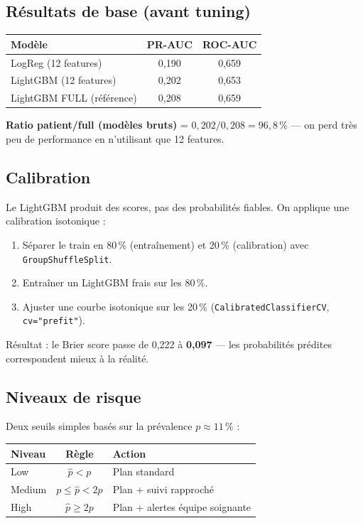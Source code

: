 \documentclass[11pt,a4paper]{article}
\begin{document}
\subsection{R\'esultats de base (avant tuning)}

\begin{center}
\begin{tabular}{@{}lcc@{}}
\toprule
\textbf{Mod\`ele} & \textbf{PR-AUC} & \textbf{ROC-AUC} \\
\midrule
LogReg (12 features) & 0{,}190 & 0{,}659 \\
LightGBM (12 features) & 0{,}202 & 0{,}653 \\
LightGBM FULL (r\'ef\'erence) & 0{,}208 & 0{,}659 \\
\bottomrule
\end{tabular}
\end{center}

\textbf{Ratio patient/full (mod\`eles bruts)} = $0{,}202 / 0{,}208 = 96{,}8\,\%$ --- on perd tr\`es peu de performance en n'utilisant que 12 features.

\subsection{Calibration}

Le LightGBM produit des scores, pas des probabilit\'es fiables. On applique une calibration isotonique :
\begin{enumerate}
  \item S\'eparer le train en 80\,\% (entra\^inement) et 20\,\% (calibration) avec \texttt{GroupShuffleSplit}.
  \item Entra\^iner un LightGBM frais sur les 80\,\%.
  \item Ajuster une courbe isotonique sur les 20\,\% (\texttt{CalibratedClassifierCV}, \texttt{cv="prefit"}).
\end{enumerate}

R\'esultat : le Brier score passe de 0{,}222 \`a \textbf{0{,}097} --- les probabilit\'es pr\'edites correspondent mieux \`a la r\'ealit\'e.

\subsection{Niveaux de risque}

Deux seuils simples bas\'es sur la pr\'evalence $p \approx 11\,\%$ :

\begin{center}
\begin{tabular}{@{}lcl@{}}
\toprule
\textbf{Niveau} & \textbf{R\`egle} & \textbf{Action} \\
\midrule
Low & $\hat{p} < p$ & Plan standard \\
Medium & $p \le \hat{p} < 2p$ & Plan + suivi rapproch\'e \\
High & $\hat{p} \ge 2p$ & Plan + alertes \'equipe soignante \\
\bottomrule
\end{tabular}
\end{center}
\end{document}

